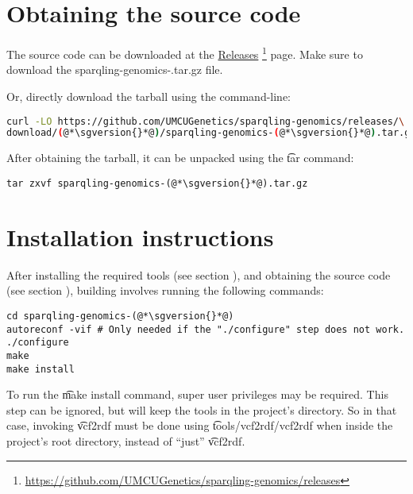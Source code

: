 \section{Obtaining the source code}
\label{sec:obtaining-tarball}

  \begin{sloppypar}
  The source code can be downloaded at the
  \href{https://github.com/UMCUGenetics/sparqling-genomics/releases}%
  {Releases}%
  \footnote{\url{https://github.com/UMCUGenetics/sparqling-genomics/releases}}
  page.  Make sure to download the {\fontfamily{\ttdefault}\selectfont
    sparqling-genomics-\sgversion{}.tar.gz} file.
  \end{sloppypar}

  Or, directly download the tarball using the command-line:
\begin{siderules}
\begin{lstlisting}[language=bash]
curl -LO https://github.com/UMCUGenetics/sparqling-genomics/releases/\
download/(@*\sgversion{}*@)/sparqling-genomics-(@*\sgversion{}*@).tar.gz
\end{lstlisting}
\end{siderules}

  After obtaining the tarball, it can be unpacked using the \t{tar}
  command:

\begin{siderules}
\begin{lstlisting}
tar zxvf sparqling-genomics-(@*\sgversion{}*@).tar.gz
\end{lstlisting}
\end{siderules}

\section{Installation instructions}

  After installing the required tools (see section ),
  and obtaining the source code (see section \refer{sec:obtaining-tarball}),
  building involves running the following commands:

\begin{siderules}
\begin{lstlisting}
cd sparqling-genomics-(@*\sgversion{}*@)
autoreconf -vif # Only needed if the "./configure" step does not work.
./configure
make
make install
\end{lstlisting}
\end{siderules}

  To run the \t{make install} command, super user privileges may be
  required.  This step can be ignored, but will keep the tools in the project's
  directory.  So in that case, invoking \t{vcf2rdf} must be done using
  \t{tools/vcf2rdf/vcf2rdf} when inside the project's root directory,
  instead of ``just'' \t{vcf2rdf}.

